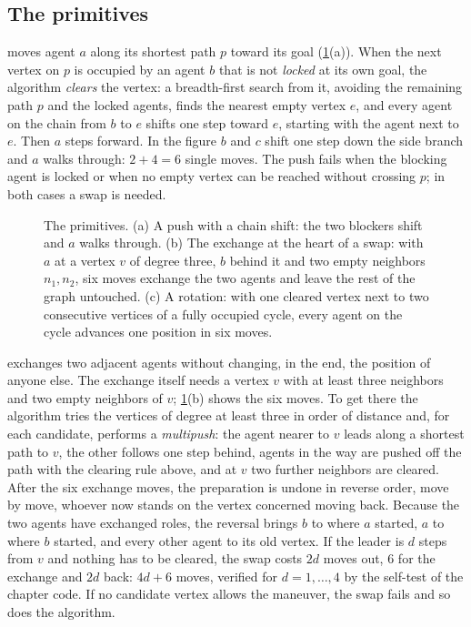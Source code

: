 \subsection{The primitives}

 moves agent $a$ along its shortest path $p$ toward its goal
(\cref{fig:ch11-push-swap}(a)). When the next vertex on $p$ is occupied by
an agent $b$ that is not \emph{locked} at its own goal, the algorithm
\emph{clears} the vertex: a breadth-first search from it, avoiding the
remaining path $p$ and the locked agents, finds the nearest empty vertex
$e$, and every agent on the chain from $b$ to $e$ shifts one step toward
$e$, starting with the agent next to $e$. Then $a$ steps forward. In the
figure $b$ and $c$ shift one step down the side branch and $a$ walks
through: $2 + 4 = 6$ single moves. The push fails when the blocking agent
is locked or when no empty vertex can be reached without crossing $p$; in
both cases a swap is needed.

\begin{figure}[!tb]
  \centering
  \caption{The primitives. (a) A push with a chain shift: the two blockers
  shift and $a$ walks through. (b) The exchange at the heart of a swap:
  with $a$ at a vertex $v$ of degree three, $b$ behind it and two empty
  neighbors $n_1, n_2$, six moves exchange the two agents and leave the
  rest of the graph untouched. (c) A rotation: with one cleared vertex next
  to two consecutive vertices of a fully occupied cycle, every agent on the
  cycle advances one position in six moves.}
  \label{fig:ch11-push-swap}
\end{figure}

 exchanges two adjacent agents without changing, in the
end, the position of anyone else. The exchange
itself needs a vertex $v$ with at least three neighbors and two empty
neighbors of $v$; \cref{fig:ch11-push-swap}(b) shows the six moves. To get
there the algorithm tries the vertices of degree at least three in order of
distance and, for each candidate, performs a \emph{multipush}: the agent
nearer to $v$ leads along a shortest path to $v$, the other follows one
step behind, agents in the way are pushed off the path with the clearing
rule above, and at $v$ two further neighbors are cleared. After the six
exchange moves, the preparation is undone in reverse order, move by move,
whoever now stands on the vertex concerned moving back. Because the two
agents have exchanged roles, the reversal brings $b$ to where $a$ started,
$a$ to where $b$ started, and every other agent to its old vertex. If the
leader is $d$ steps from $v$ and nothing has to be cleared, the swap costs
$2d$ moves out, $6$ for the exchange and $2d$ back: $4d + 6$ moves,
verified for $d = 1, \dots, 4$ by the self-test of the chapter code. If no
candidate vertex allows the maneuver, the swap fails and so does the
algorithm.

